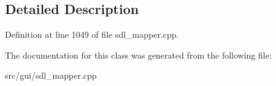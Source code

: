 \subsection{Detailed Description}


Definition at line 1049 of file sdl\-\_\-mapper.\-cpp.



The documentation for this class was generated from the following file\-:\begin{DoxyCompactItemize}
\item 
src/gui/sdl\-\_\-mapper.\-cpp\end{DoxyCompactItemize}
